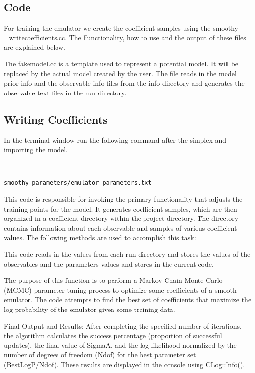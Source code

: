 \documentclass[12pt]{article}
\numberwithin{equation}{section}
\numberwithin{figure}{section}
\begin{document}
\subsection{Code}

For training the emulator we create the coefficient samples using the smoothy
\_writecoefficients.cc. The Functionality, how to use and the output of these files are explained below.

The fakemodel.cc is a template used to represent a potential model. It will be replaced by the actual model created by the user. The file reads in the model prior info and the observable info files from the info directory and generates the observable text files in the run directory. 
 
\subsection{Writing Coefficients}

In the terminal window run the following command after the simplex and importing the model.

{\tt 
\begin{verbatim}
smoothy parameters/emulator_parameters.txt 
\end{verbatim}
}

This code is responsible for invoking the primary functionality that adjusts the training points for the model. It generates coefficient samples, which are then organized in a coefficient directory within the project directory. The directory contains information about each observable and samples of various coefficient values. The following methods are used to accomplish this task:

This code reads in the values from each run directory and stores the values of the observables and the parameters values and stores in the current code. 

The purpose of this function is to perform a Markov Chain Monte Carlo (MCMC) parameter tuning process to optimize some coefficients of a smooth emulator. The code attempts to find the best set of coefficients that maximize the log probability of the emulator given some training data. 

Final Output and Results:
After completing the specified number of iterations, the algorithm calculates the success percentage (proportion of successful updates), the final value of SigmaA, and the log-likelihood normalized by the number of degrees of freedom (Ndof) for the best parameter set (BestLogP/Ndof). These results are displayed in the console using CLog::Info(). 
\end{document}
